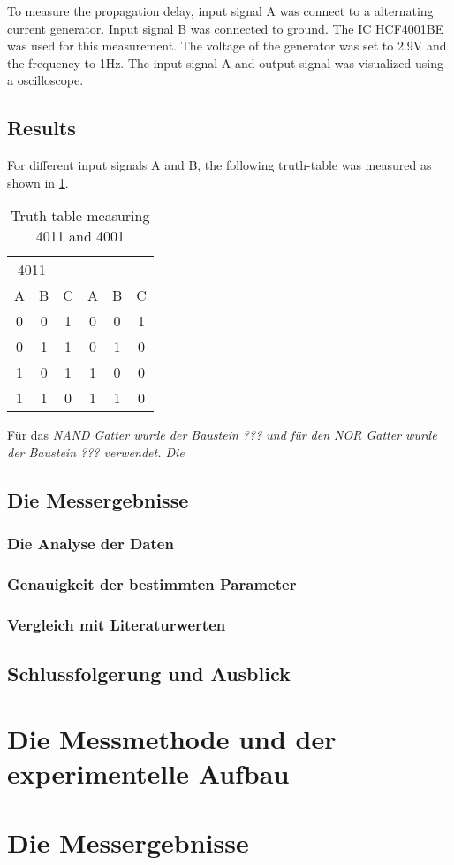 \documentclass[journal]{IEEEtran}
\begin{document}
To measure the propagation delay, input signal A was connect to a alternating
current generator. Input signal B was connected to ground. The IC HCF4001BE
was used for this measurement. The voltage of the generator was set to 2.9V and
the frequency to 1Hz. The input signal A and output signal was visualized using
a oscilloscope.

\subsection{Results}

For different input signals A and B, the following truth-table was measured as
shown in \ref{truthtable}.

\begin{table}
\centering
\begin{tabular}{c c | c || c c | c}
  \multicolumn{2}{c}{4011}
  \multicolumn{5}{c}{4001} \\
  A & B & C & A & B & C \\ \hline
  0 & 0 & 1 & 0 & 0 & 1 \\
  0 & 1 & 1 & 0 & 1 & 0 \\
  1 & 0 & 1 & 1 & 0 & 0 \\
  1 & 1 & 0 & 1 & 1 & 0 \\ 
\end{tabular}
\label{truthtable}
\caption{Truth table measuring 4011 and 4001}
\end{table}




Für das \em{NAND} Gatter wurde der Baustein ??? und für den \em{NOR} Gatter
wurde der Baustein ??? verwendet. Die 

\subsection{Die Messergebnisse}

\subsubsection{Die Analyse der Daten}

\subsubsection{Genauigkeit der bestimmten Parameter}

\subsubsection{Vergleich mit Literaturwerten}

\subsection{Schlussfolgerung und Ausblick }

\section{Die Messmethode und der experimentelle Aufbau}

\section{Die Messergebnisse}
\end{document}

